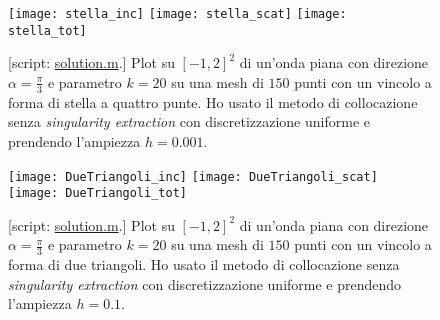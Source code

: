 \begin{figure}[h]
	\centering
	\texttt{[image: stella\_inc]}
	\texttt{[image: stella\_scat]}
	\texttt{[image: stella\_tot]}
	\caption{[script: \href{https://github.com/Daldossi/BEM/blob/main/solution.m}{solution.m}.] Plot su $[-1,2]^2$ di un'onda piana con direzione $\alpha=\frac{\pi}{3}$ e parametro $k=20$ su una mesh di $150$ punti con un vincolo a forma di stella a quattro punte. Ho usato il metodo di collocazione senza \textit{singularity extraction} con discretizzazione uniforme e prendendo l'ampiezza $h=0.001$.}
	\label{stella}
\end{figure}
\begin{figure}[h]
	\centering
	\texttt{[image: DueTriangoli\_inc]}
	\texttt{[image: DueTriangoli\_scat]}
	\texttt{[image: DueTriangoli\_tot]}
	\caption{[script: \href{https://github.com/Daldossi/BEM/blob/main/solution.m}{solution.m}.] Plot su $[-1,2]^2$ di un'onda piana con direzione $\alpha=\frac{\pi}{3}$ e parametro $k=20$ su una mesh di $150$ punti con un vincolo a forma di due triangoli. Ho usato il metodo di collocazione senza \textit{singularity extraction} con discretizzazione uniforme e prendendo l'ampiezza $h=0.1$.}
	\label{2triangoli}
\end{figure}



